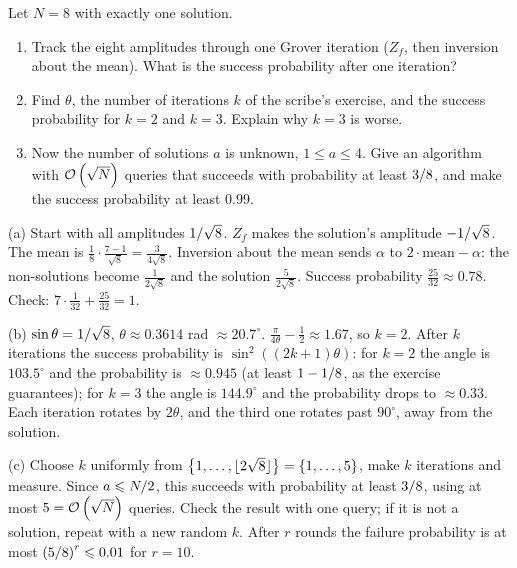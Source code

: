 \begin{question}
    Let $N = 8$ with exactly one solution.
    \begin{enumerate}[label=(\alph*)]
        \item Track the eight amplitudes through one Grover iteration ($Z_f$, then inversion about
              the mean). What is the success probability after one iteration?
        \item Find $\theta$, the number of iterations $k$ of the scribe's exercise, and the success
              probability for $k = 2$ and $k = 3$. Explain why $k = 3$ is worse.
        \item Now the number of solutions $a$ is unknown, $1 \leq a \leq 4$. Give an algorithm with
              $\mathcal{O}\left(\sqrt{N}\right)$ queries that succeeds with probability at least $3/8$,
              and make the success probability at least $0.99$.
    \end{enumerate}
\end{question}
\begin{msolution}
    (a) Start with all amplitudes $1/\sqrt{8}$. $Z_f$ makes the solution's amplitude
    $-1/\sqrt{8}$. The mean is $\frac{1}{8} \cdot \frac{7 - 1}{\sqrt{8}} = \frac{3}{4\sqrt{8}}$.
    Inversion about the mean sends $\alpha$ to $2 \cdot \text{mean} - \alpha$: the non-solutions
    become $\frac{1}{2\sqrt{8}}$ and the solution $\frac{5}{2\sqrt{8}}$. Success probability
    $\frac{25}{32} \approx 0.78$. Check: $7 \cdot \frac{1}{32} + \frac{25}{32} = 1$.

    (b) $\sin\theta = 1/\sqrt{8}$, $\theta \approx 0.3614$ rad $\approx 20.7^\circ$.
    $\frac{\pi}{4\theta} - \frac{1}{2} \approx 1.67$, so $k = 2$. After $k$ iterations the success
    probability is $\sin^2\left((2k+1)\theta\right)$: for $k = 2$ the angle is $103.5^\circ$ and
    the probability is $\approx 0.945$ (at least $1 - 1/8$, as the exercise
    guarantees); for $k = 3$ the angle is $144.9^\circ$ and the probability drops to
    $\approx 0.33$. Each iteration rotates by $2\theta$, and the third one rotates past
    $90^\circ$, away from the solution.

    (c) Choose $k$ uniformly from $\set{1, \dots, \floor{2\sqrt{8}}} = \set{1, \dots, 5}$, make
    $k$ iterations and measure. Since $a \leqslant N/2$, this succeeds with probability at
    least $3/8$, using at most $5 = \mathcal{O}\left(\sqrt{N}\right)$ queries. Check the result with one
    query; if it is not a solution, repeat with a new random $k$. After $r$ rounds the failure
    probability is at most $\left(5/8\right)^r \leqslant 0.01$ for $r = 10$.
\end{msolution}

